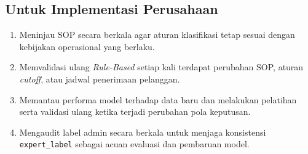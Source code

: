 \subsection{Untuk Implementasi Perusahaan}

\begin{enumerate}
    \item Meninjau SOP secara berkala agar aturan klasifikasi tetap sesuai dengan kebijakan operasional yang berlaku.
    \item Memvalidasi ulang \textit{Rule-Based} setiap kali terdapat perubahan SOP, aturan \textit{cutoff}, atau jadwal penerimaan pelanggan.
    \item Memantau performa model terhadap data baru dan melakukan pelatihan serta validasi ulang ketika terjadi perubahan pola keputusan.
    \item Mengaudit label admin secara berkala untuk menjaga konsistensi \texttt{expert\_label} sebagai acuan evaluasi dan pembaruan model.
\end{enumerate}
